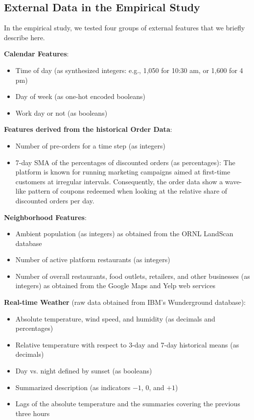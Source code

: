 \subsection{External Data in the Empirical Study}
\label{external_data}

In the empirical study, we tested four groups of external features that we
    briefly describe here.

\vskip 0.1in

\textbf{Calendar Features}:
\begin{itemize}
    \item Time of day (as synthesized integers: e.g., 1,050 for 10:30 am,
                       or 1,600 for 4 pm)
    \item Day of week (as one-hot encoded booleans)
    \item Work day or not (as booleans)
\end{itemize}

\vskip 0.1in

\textbf{Features derived from the historical Order Data}:
\begin{itemize}
    \item Number of pre-orders for a time step (as integers)
    \item 7-day SMA of the percentages of discounted orders (as percentages):
          The platform is known for running marketing campaigns aimed at
          first-time customers at irregular intervals. Consequently, the
          order data show a wave-like pattern of coupons redeemed when looking
          at the relative share of discounted orders per day.
\end{itemize}

\vskip 0.1in

\textbf{Neighborhood Features}:
\begin{itemize}
    \item Ambient population (as integers) as obtained from the ORNL LandScan
          database
    \item Number of active platform restaurants (as integers)
    \item Number of overall restaurants, food outlets, retailers, and other
          businesses (as integers) as obtained from the Google Maps and Yelp
          web services
\end{itemize}

\vskip 0.1in

\textbf{Real-time Weather} (raw data obtained from IBM's
                            Wunderground database):
\begin{itemize}
    \item Absolute temperature, wind speed, and humidity
          (as decimals and percentages)
    \item Relative temperature with respect to 3-day and 7-day historical
          means (as decimals)
    \item Day vs. night defined by sunset (as booleans)
    \item Summarized description (as indicators $-1$, $0$, and $+1$)
    \item Lags of the absolute temperature and the summaries covering the
          previous three hours
\end{itemize}

